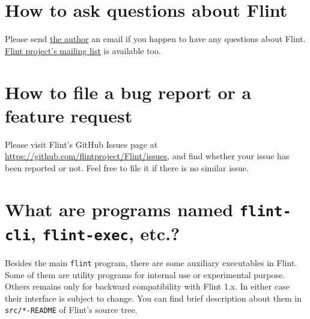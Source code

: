 \documentclass[a4paper,10pt]{report}
\newcommand{\filename}[1]{{\tt #1}}
\begin{document}
\section{How to ask questions about Flint}
Please send \href{mailto:tabe@fixedpoint.jp}{the author} an email if you happen
to have any questions about Flint.
\href{https://groups.google.com/g/flint-discuss}{Flint project's mailing list}
is available too.

\section{How to file a bug report or a feature request}
Please visit Flint's GitHub Issues page at
\url{https://github.com/flintproject/Flint/issues},
and find whether your issue has been reported or not.
Feel free to file it if there is no similar issue.

\section{What are programs named \filename{flint-cli}, \filename{flint-exec}, etc.?}
Besides the main \filename{flint} program, there are some auxiliary executables in
Flint. Some of them are utility programs for internal use or experimental
purpose. Others remains only for backward compatibility with Flint 1.x. In
either case their interface is subject to change. You can find brief description about
them in \filename{src/*-README} of Flint's source tree.




\end{document}
